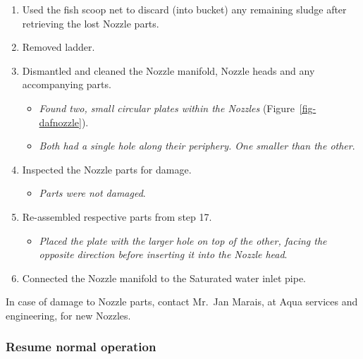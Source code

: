 \documentclass[
  12pt,
]{report}
\providecommand{\tightlist}{%
  \setlength{\itemsep}{0pt}\setlength{\parskip}{0pt}}\usepackage{longtable,booktabs,array}
\begin{document}
\begin{enumerate}
  \begin{itemize}
  \tightlist
  \item
    \emph{Used Fish scoop net and bucket}.
  \item
    \emph{Had to scoop out some sludge first to get to the lost parts}.
  \end{itemize}
\item
  Used the fish scoop net to discard (into bucket) any remaining sludge
  after retrieving the lost Nozzle parts.
\item
  Removed ladder.
\item
  Dismantled and cleaned the Nozzle manifold, Nozzle heads and any
  accompanying parts.

  \begin{itemize}
  \tightlist
  \item
    \emph{Found two, small circular plates within the Nozzles}
    (Figure~\ref{fig-dafnozzle}).
  \item
    \emph{Both had a single hole along their periphery. One smaller than
    the other}.
  \end{itemize}
\item
  Inspected the Nozzle parts for damage.

  \begin{itemize}
  \tightlist
  \item
    \emph{Parts were not damaged}.
  \end{itemize}
\item
  Re-assembled respective parts from step 17.

  \begin{itemize}
  \tightlist
  \item
    \emph{Placed the plate with the larger hole on top of the other,
    facing the opposite direction before inserting it into the Nozzle
    head}.
  \end{itemize}
\item
  Connected the Nozzle manifold to the Saturated water inlet pipe.
\end{enumerate}

{In case of damage to Nozzle parts, contact Mr.~Jan Marais, at Aqua
services and engineering, for new Nozzles}.

\hypertarget{resume-normal-operation-1}{%
\subsubsection{Resume normal
operation}\label{resume-normal-operation-1}}
\end{document}
